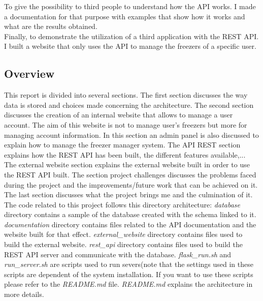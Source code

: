 To give the possibility to third people to understand how the API works. I made a documentation for that purpose with examples that show how it works and what are the results obtained. \\

Finally, to demonstrate the utilization of a third application with the REST API. I built a website that only uses the API to manage the freezers of a specific user.\\

\subsection{Overview}
This report is divided into several sections. The first section discusses the way data is stored and choices made concerning the architecture. The second section discusses the creation of an internal website that allows to manage a user account. The aim of this website is not to manage user's freezers but more for managing account information. In this section an admin panel is also discussed to explain how to manage the freezer manager system. The API REST section explains how the REST API has been built, the different features available,... The external website section explains the external website built in order to use the REST API built. The section project challenges discusses the problems faced during the project and the improvements/future work that can be achieved on it. The last section discusses what the project brings me and the culmination of it.\\

The code related to this project follows this directory architecture:
\textit{database} directory contains a sample of the database created with the schema linked to it. \textit{documentation} directory contains files related to the API documentation and the website built for that effect. \textit{external\_website} directory contains files used to build the external website. \textit{rest\_api} directory contains files used to build the REST API server and communicate with the database. \textit{flask\_run.sh} and \textit{run\_server.sh} are scripts used to run severs(note that the settings used in these scripts are dependent of the system installation. If you want to use these scripts please refer to the \textit{README.md} file. \textit{README.md} explains the architecture in more details.

